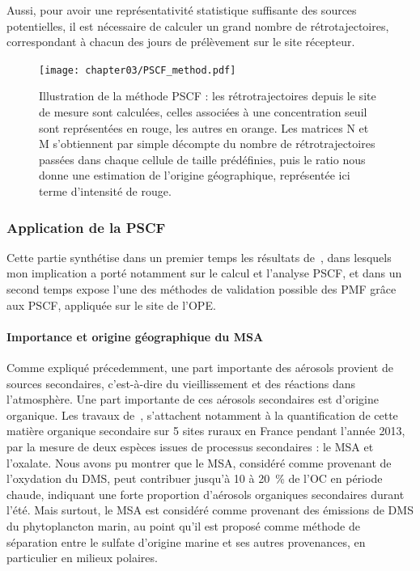 Aussi, pour avoir une représentativité statistique suffisante des sources potentielles, il
est nécessaire de calculer un grand nombre de rétrotajectoires, correspondant à chacun des
jours de prélèvement sur le site récepteur.

\begin{figure}[ht]
    \centering
    \texttt{[image: chapter03/PSCF\_method.pdf]}
    \caption{Illustration de la méthode PSCF : les rétrotrajectoires depuis le site de
        mesure sont calculées, celles associées à une concentration seuil sont
        représentées en rouge, les autres en orange. Les matrices N et M s'obtiennent par
        simple décompte du nombre de rétrotrajectoires passées dans chaque cellule de
        taille prédéfinies, puis le ratio nous donne une estimation de l'origine
    géographique, représentée ici terme d'intensité de rouge.}%
    \label{fig:chapter02/PSCF_method}
\end{figure}

\subsubsection{Application de la PSCF}%
\label{ssub:application_de_la_pscf}

\begin{tcolorbox}[colback=red!5!white,colframe=Melon,title=Note]
Cette partie synthétise dans un premier temps les résultats de~\cite{gollyOrganic2019},
dans lesquels mon implication a porté notamment sur le calcul et l'analyse PSCF, et dans
un second temps expose l'une des méthodes de validation possible des PMF grâce aux PSCF,
appliquée sur le site de l'OPE.
\end{tcolorbox}

\paragraph{Importance et origine géographique du MSA}%
\label{par:origine_terrestre_ou_marine_du_msa_}

Comme expliqué précedemment, une part importante des aérosols provient de sources
secondaires, c'est-à-dire du vieillissement et des réactions dans l'atmosphère. Une part
importante de ces aérosols secondaires est d'origine organique. Les travaux
de~\textcite{gollyOrganic2019}, s'attachent notamment à la quantification de cette matière
organique secondaire sur 5 sites ruraux en France pendant l'année 2013, par la mesure de
deux espèces issues de processus secondaires : le MSA et l'oxalate.  Nous avons pu montrer
que le MSA, considéré comme provenant de l'oxydation du DMS, peut contribuer jusqu'à 10 à
\SI{20}{\percent} de l'OC en période chaude, indiquant une forte proportion d'aérosols organiques
secondaires durant l'été. Mais surtout, le MSA est considéré comme provenant des émissions
de DMS du phytoplancton marin, au point qu'il est proposé comme méthode de séparation
entre le sulfate d'origine marine et ses autres provenances, en particulier en milieux
polaires.

